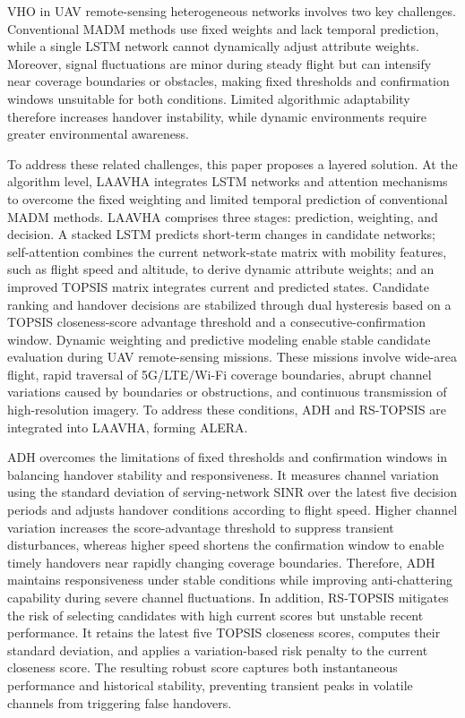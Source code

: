 \documentclass[remotesensing,article,submit,moreauthors]{Definitions/mdpi}
\begin{document}
VHO in UAV remote-sensing heterogeneous networks involves two key challenges. Conventional MADM methods use fixed weights and lack temporal prediction, while a single LSTM network cannot dynamically adjust attribute weights. Moreover, signal fluctuations are minor during steady flight but can intensify near coverage boundaries or obstacles, making fixed thresholds and confirmation windows unsuitable for both conditions. Limited algorithmic adaptability therefore increases handover instability, while dynamic environments require greater environmental awareness.

To address these related challenges, this paper proposes a layered solution. At the algorithm level, LAAVHA integrates LSTM networks and attention mechanisms to overcome the fixed weighting and limited temporal prediction of conventional MADM methods. LAAVHA comprises three stages: prediction, weighting, and decision. A stacked LSTM predicts short-term changes in candidate networks; self-attention combines the current network-state matrix with mobility features, such as flight speed and altitude, to derive dynamic attribute weights; and an improved TOPSIS matrix integrates current and predicted states. Candidate ranking and handover decisions are stabilized through dual hysteresis based on a TOPSIS closeness-score advantage threshold and a consecutive-confirmation window. Dynamic weighting and predictive modeling enable stable candidate evaluation during UAV remote-sensing missions. These missions involve wide-area flight, rapid traversal of 5G/LTE/Wi-Fi coverage boundaries, abrupt channel variations caused by boundaries or obstructions, and continuous transmission of high-resolution imagery. To address these conditions, ADH and RS-TOPSIS are integrated into LAAVHA, forming ALERA.

ADH overcomes the limitations of fixed thresholds and confirmation windows in balancing handover stability and responsiveness. It measures channel variation using the standard deviation of serving-network SINR over the latest five decision periods and adjusts handover conditions according to flight speed. Higher channel variation increases the score-advantage threshold to suppress transient disturbances, whereas higher speed shortens the confirmation window to enable timely handovers near rapidly changing coverage boundaries. Therefore, ADH maintains responsiveness under stable conditions while improving anti-chattering capability during severe channel fluctuations. In addition, RS-TOPSIS mitigates the risk of selecting candidates with high current scores but unstable recent performance. It retains the latest five TOPSIS closeness scores, computes their standard deviation, and applies a variation-based risk penalty to the current closeness score. The resulting robust score captures both instantaneous performance and historical stability, preventing transient peaks in volatile channels from triggering false handovers.
\end{document}
